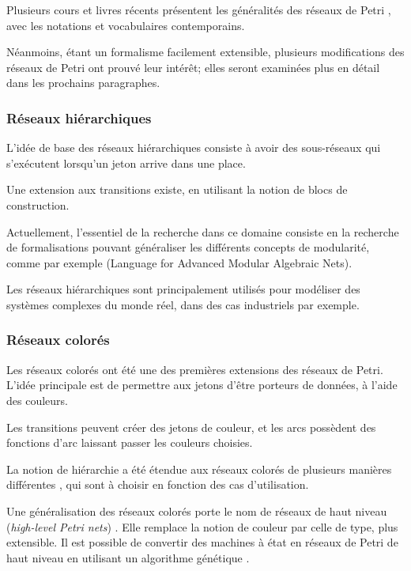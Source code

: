 Plusieurs cours et livres récents présentent les généralités des réseaux de Petri \citep[voir][]{david2010discrete, diaz2013petri}, avec les notations et vocabulaires contemporains.

Néanmoins, étant un formalisme facilement extensible, plusieurs modifications des réseaux de Petri ont prouvé leur intérêt; elles seront examinées plus en détail dans les prochains paragraphes.
\subsubsection{Réseaux hiérarchiques}
L'idée de base des réseaux hiérarchiques consiste à avoir des sous-réseaux qui s'exécutent lorsqu'un jeton arrive dans une place.

Une extension aux transitions existe, en utilisant la notion de blocs de construction\cite{fehling1993concept}.

Actuellement, l'essentiel de la recherche dans ce domaine consiste en la recherche de formalisations pouvant généraliser les différents concepts de modularité, comme par exemple  (Language for Advanced Modular Algebraic Nets)\cite{colom2013application}.

Les réseaux hiérarchiques sont principalement utilisés pour modéliser des systèmes complexes du monde réel, dans des cas industriels par exemple.

\subsubsection{Réseaux colorés}
Les réseaux colorés\cite{zervos1977colored,jensen1987coloured} ont été une des premières extensions des réseaux de Petri. L'idée principale est de permettre aux jetons d'être porteurs de données, à l'aide des couleurs. 

Les transitions peuvent créer des jetons de couleur, et les arcs possèdent des fonctions d'arc laissant passer les couleurs choisies.

La notion de hiérarchie a été étendue aux réseaux colorés de plusieurs manières différentes \cite{rozenberg1991advances}, qui sont à choisir en fonction des cas d'utilisation.

Une généralisation des réseaux colorés porte le nom de réseaux de haut niveau (\textit{high-level Petri nets}) \cite{jensen1983high}. Elle remplace la notion de couleur par celle de type, plus extensible.
Il est possible de convertir des machines à état  en réseaux de Petri de haut niveau en utilisant un algorithme génétique \cite{alhroob2014transforming}.

